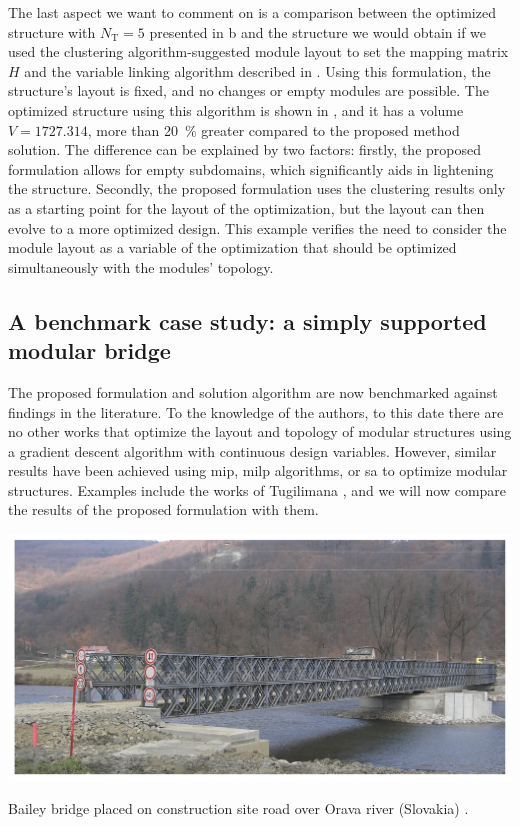 The last aspect we want to comment on is a comparison between the optimized structure with $N_\text{T}=5$ presented in b and the structure we would obtain if we used the clustering algorithm-suggested module layout to set the mapping matrix $H$ and the variable linking algorithm described in . Using this formulation, the structure's layout is fixed, and no changes or empty modules are possible. The optimized structure using this algorithm is shown in , and it has a volume $V = 1727.314$, more than \qty{20}{\percent} greater compared to the proposed method solution. The difference can be explained by two factors: firstly, the proposed formulation allows for empty subdomains, which significantly aids in lightening the structure. Secondly, the proposed formulation uses the clustering results only as a starting point for the layout of the optimization, but the layout can then evolve to a more optimized design. This example verifies the need to consider the module layout as a variable of the optimization that should be optimized simultaneously with the modules' topology.

\subsection{A benchmark case study: a simply supported modular bridge}
The proposed formulation and solution algorithm are now benchmarked against findings in the literature. To the knowledge of the authors, to this date there are no other works that optimize the layout and topology of modular structures using a gradient descent algorithm with continuous design variables. However, similar results have been achieved using \gls{mip}, \gls{milp} algorithms, or \gls{sa} to optimize modular structures. Examples include the works of Tugilimana , and we will now compare the results of the proposed formulation with them.

\begin{marginfigure}
    \centering
    \includegraphics[width=\linewidth]{figures/06_DMO/00_bailey_bridge/applsci-12-03788-g002.png}
    \caption{Bailey bridge placed on construction site road over Orava river (Slovakia) \cite{prokop_load-carrying_2022}. }
    \label{fig:06_bailey}
\end{marginfigure}

